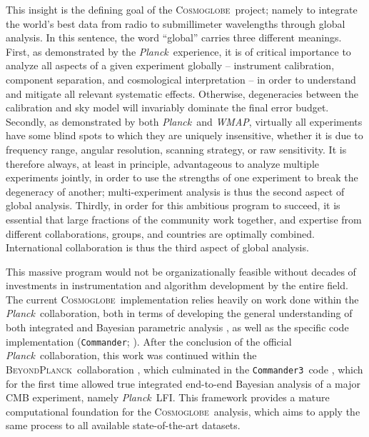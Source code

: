 \documentclass[twocolumn]{../../common/aa}
\def\WMAP{\emph{WMAP}}
\def\Planck{\emph{Planck}}
\def\commanderthree{\texttt{Commander3}}
\newcommand{\bp}{\textsc{BeyondPlanck}}
\newcommand{\cosmoglobe}{\textsc{Cosmoglobe}}
\begin{document}
This insight is the defining goal of the \cosmoglobe\ project; namely to integrate the world's best data from radio to submillimeter wavelengths through global analysis. In this sentence, the word ``global'' carries three different meanings. First, as demonstrated by the \Planck\ experience, it is of critical importance to analyze all aspects of a given experiment globally -- instrument calibration, component separation, and cosmological interpretation -- in order to understand and mitigate all relevant systematic effects. Otherwise, degeneracies between the calibration and sky model will invariably dominate the final error budget. Secondly, as demonstrated by both \Planck\ and \WMAP, virtually all experiments have some blind spots to which they are uniquely insensitive, whether it is due to frequency range, angular resolution, scanning strategy, or raw sensitivity. It is therefore always, at least in principle, advantageous to analyze multiple experiments jointly, in order to use the strengths of one experiment to break the degeneracy of another; multi-experiment analysis is thus the second aspect of global analysis. Thirdly, in order for this ambitious program to succeed, it is essential that large fractions of the community work together, and expertise from different collaborations, groups, and countries are optimally combined.  International collaboration is thus the third aspect of global analysis.

This massive program would not be organizationally feasible without decades of investments in instrumentation and algorithm development by the entire field. The current \cosmoglobe\ implementation relies heavily on work done within the \Planck\ collaboration, both in terms of developing the general understanding of both integrated and Bayesian parametric analysis \citep[e.g.,][]{planck2014-a12,planck2016-l02,npipe}, as well as the specific code implementation (\texttt{Commander}; \citealt{eriksen:2004,eriksen:2008}). After the conclusion of the official \Planck\ collaboration, this work was continued within the \bp\ collaboration \citep{bp01}, which culminated in the \commanderthree\ code \citep{bp03}, which for the first time allowed true integrated end-to-end Bayesian analysis of a major CMB experiment, namely \Planck\ LFI. This framework provides a mature computational foundation for the \cosmoglobe\ analysis, which aims to apply the same process to all available state-of-the-art datasets.
\end{document}
